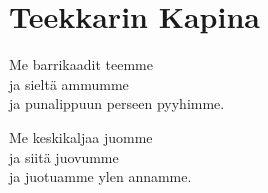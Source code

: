\section{Teekkarin Kapina}
Me barrikaadit teemme\\
ja sieltä ammumme\\
ja punalippuun perseen pyyhimme.

Me keskikaljaa juomme\\
ja siitä juovumme\\
ja juotuamme ylen annamme.